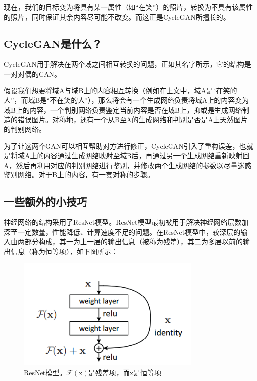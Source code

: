 \documentclass[UTF8,a4paper，12pt]{article}
\def\MC {\mathcal}
\theoremstyle{theorem}
\theoremstyle{definition}
\begin{document}
现在，我们的目标变为将具有某一属性（如“在笑”）的照片，转换为不具有该属性的照片，同时保证其余内容尽可能不改变。而这正是CycleGAN所擅长的。

\subsection{CycleGAN是什么？}

CycleGAN用于解决在两个域之间相互转换的问题，正如其名字所示，它的结构是一对对偶的GAN。

假设我们想要将域A与域B上的内容相互转换（例如在上文中，域A是“在笑的人”，而域B是“不在笑的人”），那么将会有一个生成网络负责将域A上的内容变为域B上的内容，一个判别网络负责鉴定当前内容是否在域B上，抑或是生成网络制造的错误图片。对称地，还有一个从B至A的生成网络和判别是否是A上天然图片的判别网络。

为了让这两个GAN可以相互帮助对方进行修正，CycleGAN引入了重构误差，也就是将域A上的内容通过生成网络映射至域B后，再通过另一个生成网络重新映射回A，然后再利用对应的判别网络进行鉴别，并修改两个生成网络的参数以尽量迷惑鉴别网络。对于B上的内容，有一套对称的步骤。

\subsection{一些额外的小技巧}

神经网络的结构采用了ResNet模型。ResNet模型最初被用于解决神经网络层数加深至一定数量，性能降低、计算速度不足的问题。在ResNet模型中，较深层的输入由两部分构成，其一为上一层的输出信息（被称为残差），其二为多层以前的输出信息（称为恒等项），如下图所示：

\begin{figure}[htbp]
	\centering
	\includegraphics[width=0.8\textwidth]{assets/09}
	\caption{ResNet模型。$\MC F(\mathrm x)$是残差项，而$\mathrm x$是恒等项}
\end{figure}
\end{document}
